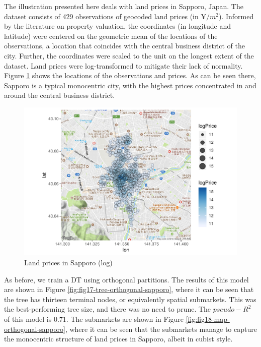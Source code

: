\documentclass[]{elsarticle} %
\makeatletter
\def\maxwidth{\ifdim\Gin@nat@width>\linewidth\linewidth
\else\Gin@nat@width\fi}
\let\Oldincludegraphics\includegraphics
\renewcommand{\includegraphics}[1]{\Oldincludegraphics[width=\maxwidth]{#1}}
\makeatother
\begin{document}
The illustration presented here deals with land prices in Sapporo,
Japan. The dataset consists of 429 observations of geocoded land prices
(in \(\yen/m^2\)). Informed by the literature on property valuation, the
coordinates (in longitude and latitude) were centered on the geometric
mean of the locations of the observations, a location that coincides
with the central business district of the city. Further, the coordinates
were scaled to the unit on the longest extent of the dataset. Land
prices were log-transformed to mitigate their lack of normality. Figure
\ref{fig:fig16-map-sapporo} shows the locations of the observations and
prices. As can be seen there, Sapporo is a typical monocentric city,
with the highest prices concentrated in and around the central business
district.

\begin{figure}
\centering
\includegraphics{Trees_with_Base_Functions_v2_files/figure-latex/fig16-map-sapporo-1.pdf}
\caption{\label{fig:fig16-map-sapporo}Land prices in Sapporo (log)}
\end{figure}

As before, we train a DT using orthogonal partitions. The results of
this model are shown in Figure \ref{fig:fig17-tree-orthogonal-sapporo},
where it can be seen that the tree has thirteen terminal nodes, or
equivalently spatial submarkets. This was the best-performing tree size,
and there was no need to prune. The \(pseudo-R^2\) of this model is
\(0.71\). The submarkets are shown in Figure
\ref{fig:fig18-map-orthogonal-sapporo}, where it can be seen that the
submarkets manage to capture the monocentric structure of land prices in
Sapporo, albeit in cubist style.
\end{document}
